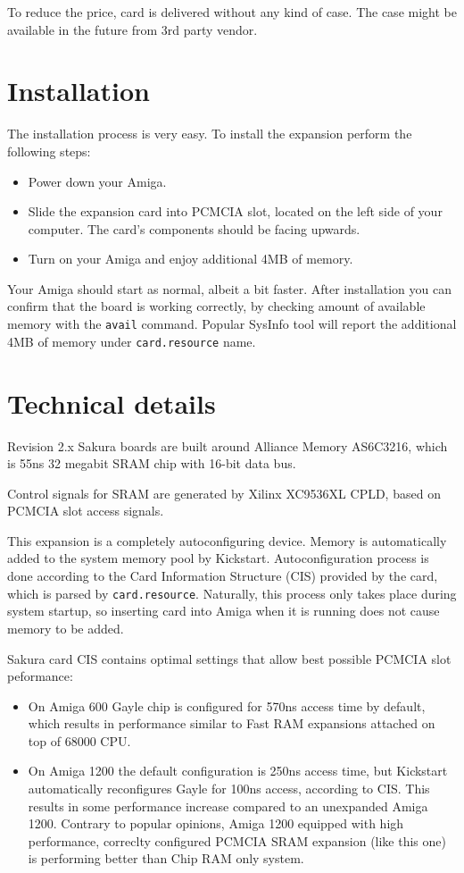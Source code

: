 \documentclass[10pt,a5paper]{article}
\begin{document}
To reduce the price, card is delivered without any kind of case. The case might be available in the future from 3rd party vendor.

\section*{Installation}

The installation process is very easy. To install the expansion perform the following steps:

\begin{itemize}
	\item Power down your Amiga.
	\item Slide the expansion card into PCMCIA slot, located on the left side of your computer. The card's components should be facing upwards.
	\item Turn on your Amiga and enjoy additional 4MB of memory.
\end{itemize}

Your Amiga should start as normal, albeit a bit faster. After installation you can confirm that the board is working correctly, by checking amount of available memory with the {\tt avail} command. Popular SysInfo tool will report the additional 4MB of memory under {\tt card.resource} name.

\section*{Technical details}

Revision 2.x Sakura boards are built around Alliance Memory AS6C3216, which is 55ns 32 megabit SRAM chip with 16-bit data bus.

Control signals for SRAM are generated by Xilinx XC9536XL CPLD, based on PCMCIA slot access signals.

This expansion is a completely autoconfiguring device. Memory is automatically added to the system memory pool by Kickstart. Autoconfiguration process is done according to the Card Information Structure (CIS) provided by the card, which is parsed by {\tt card.resource}. Naturally, this process only takes place during system startup, so inserting card into Amiga when it is running does not cause memory to be added.

Sakura card CIS contains optimal settings that allow best possible PCMCIA slot peformance:
\begin{itemize}
	\item On Amiga 600 Gayle chip is configured for 570ns access time by default, which results in performance similar to Fast RAM expansions attached on top of 68000 CPU.
	\item On Amiga 1200 the default configuration is 250ns access time, but Kickstart automatically reconfigures Gayle for 100ns access, according to CIS. This results in some performance increase compared to an unexpanded Amiga 1200. Contrary to popular opinions, Amiga 1200 equipped with high performance, correclty configured PCMCIA SRAM expansion (like this one) is performing better than Chip RAM only system.
\end{itemize}
\end{document}
